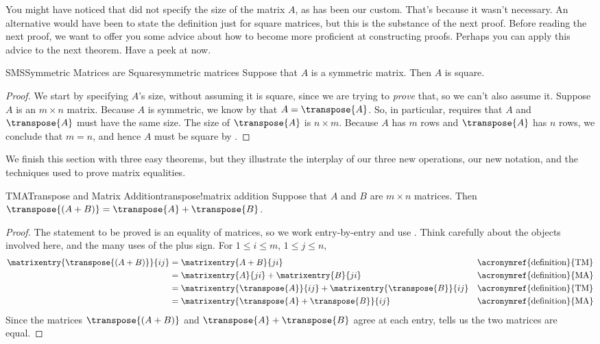 %
You might have noticed that  did not specify the size of the matrix $A$, as has been our custom.  That's because it wasn't necessary.  An alternative would have been to state the definition just for square matrices, but this is the substance of the next proof.
%
Before reading the next proof, we want to offer you some advice about how to become more proficient at constructing proofs.  Perhaps you can apply this advice to the next theorem.  Have a peek at  now.
%
\begin{theorem}{SMS}{Symmetric Matrices are Square}{symmetric matrices}
Suppose that $A$ is a symmetric matrix.  Then $A$ is square.
\end{theorem}
%
\begin{proof}
We start by specifying $A$'s size, without assuming it is square, since we are trying to {\em prove} that, so we can't also assume it.  Suppose $A$ is an $m\times n$ matrix.  Because $A$ is symmetric, we know by  that $A=\transpose{A}$.  So, in particular,  requires that $A$ and $\transpose{A}$ must have the same size.  The size of $\transpose{A}$ is $n\times m$.  Because $A$ has $m$ rows and $\transpose{A}$ has $n$ rows, we conclude that $m=n$, and hence $A$ must be square by .
\end{proof}
%
We finish this section with three easy theorems, but they illustrate the interplay of our three new operations, our new notation, and the techniques used to prove matrix equalities.
%
\begin{theorem}{TMA}{Transpose and Matrix Addition}{transpose!matrix addition}
Suppose that $A$ and $B$ are $m\times n$ matrices.  Then  $\transpose{(A+B)}=\transpose{A}+\transpose{B}$.
%
\end{theorem}
%
\begin{proof}
The statement  to be proved is an equality of matrices, so we work entry-by-entry and use .  Think carefully about the objects involved here, and the many uses of the plus sign.  For $1\leq i\leq m$, $1\leq j\leq n$,
%
\begin{align*}
\matrixentry{\transpose{(A+B)}}{ij}
&=\matrixentry{A+B}{ji}&&\text{\acronymref{definition}{TM}}\\
&=\matrixentry{A}{ji}+\matrixentry{B}{ji}&&\text{\acronymref{definition}{MA}}\\
&=\matrixentry{\transpose{A}}{ij}+\matrixentry{\transpose{B}}{ij}&&\text{\acronymref{definition}{TM}}\\
&=\matrixentry{\transpose{A}+\transpose{B}}{ij}&&\text{\acronymref{definition}{MA}}
%
\end{align*}
%
Since the matrices $\transpose{(A+B)}$ and $\transpose{A}+\transpose{B}$ agree at each entry,  tells us the two matrices are equal.
%
\end{proof}
